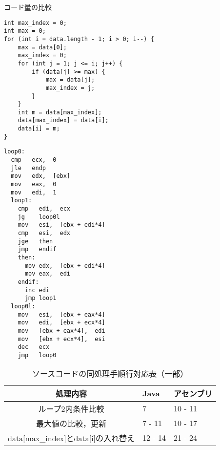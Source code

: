 \begin{table}[h]
  \caption{コード量の比較}
  \label{fig:ソースコード}
\begin{minipage}[t]{0.6\linewidth}
  \begin{lstlisting}[caption={Java言語での記述例}]
int max_index = 0;
int max = 0;
for (int i = data.length - 1; i > 0; i--) {
    max = data[0];
    max_index = 0;
    for (int j = 1; j <= i; j++) {
        if (data[j] >= max) {
            max = data[j];
            max_index = j;
        }
    }
    int m = data[max_index];
    data[max_index] = data[i];
    data[i] = m;
}
  \end{lstlisting}
\end{minipage}
\begin{minipage}[t]{0.4\linewidth}
  \begin{lstlisting}[caption={アセンブリ言語での記述例}]
loop0:
  cmp   ecx,  0  
  jle   endp
  mov   edx,  [ebx]   
  mov   eax,  0       
  mov   edi,  1
  loop1:
    cmp   edi,  ecx   
    jg    loop0l
    mov   esi,  [ebx + edi*4] 
    cmp   esi,  edx       
    jge   then
    jmp   endif
    then:
      mov edx,  [ebx + edi*4] 
      mov eax,  edi           
    endif:
      inc edi
      jmp loop1
  loop0l:
    mov   esi,  [ebx + eax*4]   
    mov   edi,  [ebx + ecx*4]  
    mov   [ebx + eax*4],  edi  
    mov   [ebx + ecx*4],  esi 
    dec   ecx
    jmp   loop0
  \end{lstlisting}
\end{minipage}
\end{table}
\begin{table}[h]
  \caption{ソースコードの同処理手順行対応表（一部）}
  \label{tab:対応表}
  \centering
  \begin{tabular}{cll}
    処理内容 & Java & アセンブリ\\ \hline
    ループ2内条件比較 & 7 & 10 - 11\\
    最大値の比較，更新 & 7 - 11 & 10 - 17\\
    data[max\_index]とdata[i]の入れ替え & 12 - 14 & 21 - 24\\ \hline
  \end{tabular}
\end{table}
